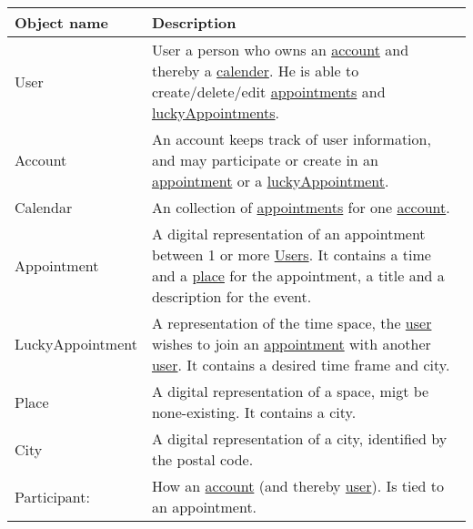 {\tabulinesep=1.2mm
\begin{tabu}{ | p{3cm} | p{13cm} |}\hline
    Object name 			& 		Description\\\hline
    User  					& 		User a person who owns an \uline{account} and thereby a \uline{calender}. He is able to create/delete/edit \uline{appointments} and  \uline{luckyAppointments}. \\\hline
    Account 				& 		An account keeps track of user information, and may participate or create in an \uline{appointment} or a \uline{luckyAppointment}. \\\hline
	Calendar				&		An collection of \uline{appointments} for one \uline{account}.\\ \hline
	Appointment				&		A digital representation of an appointment between 1 or more \uline{Users}. It contains a time and a \uline{place} for the appointment, a title and a description for the event.\\\hline
	LuckyAppointment		&		A representation of the time space, the \uline{user} wishes to join an \uline{appointment} with another \uline{user}. It contains a desired time frame and city.\\\hline
    Place 					& 		A digital representation of a space, migt be none-existing. It contains a city.\\\hline
    City 					& 		A digital representation of a city, identified by the postal code.\\\hline
	Participant: 			&		How an \uline{account} (and thereby \uline{user}). Is tied to an appointment.\\\hline
\end{tabu}
}
